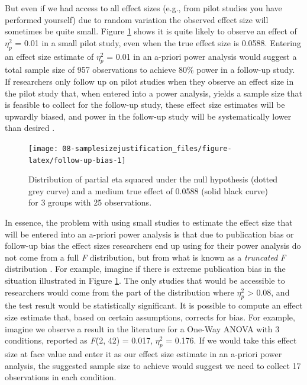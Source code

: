 \documentclass[
]{krantz}
\begin{document}
But even if we had access to all effect sizes (e.g., from pilot studies you have performed yourself) due to random variation the observed effect size will sometimes be quite small. Figure \ref{fig:follow-up-bias} shows it is quite likely to observe an effect of \(\eta_p^2\) = 0.01 in a small pilot study, even when the true effect size is 0.0588. Entering an effect size estimate of \(\eta_p^2\) = 0.01 in an a-priori power analysis would suggest a total sample size of 957 observations to achieve 80\% power in a follow-up study. If researchers only follow up on pilot studies when they observe an effect size in the pilot study that, when entered into a power analysis, yields a sample size that is feasible to collect for the follow-up study, these effect size estimates will be upwardly biased, and power in the follow-up study will be systematically lower than desired \citep{albers_when_2018}.

\begin{figure}

{\centering \texttt{[image: 08-samplesizejustification\_files/figure-latex/follow-up-bias-1]} 

}

\caption{Distribution of partial eta squared under the null hypothesis (dotted grey curve) and a medium true effect of 0.0588 (solid black curve) for 3 groups with 25 observations.}\label{fig:follow-up-bias}
\end{figure}

In essence, the problem with using small studies to estimate the effect size that will be entered into an a-priori power analysis is that due to publication bias or follow-up bias the effect sizes researchers end up using for their power analysis do not come from a full \emph{F} distribution, but from what is known as a \emph{truncated} \emph{F} distribution \citep{taylor_bias_1996}. For example, imagine if there is extreme publication bias in the situation illustrated in Figure \ref{fig:follow-up-bias}. The only studies that would be accessible to researchers would come from the part of the distribution where \(\eta_p^2\) \textgreater{} 0.08, and the test result would be statistically significant. It is possible to compute an effect size estimate that, based on certain assumptions, corrects for bias. For example, imagine we observe a result in the literature for a One-Way ANOVA with 3 conditions, reported as \emph{F}(2, 42) = 0.017, \(\eta_p^2\) = 0.176. If we would take this effect size at face value and enter it as our effect size estimate in an a-priori power analysis, the suggested sample size to achieve would suggest we need to collect 17 observations in each condition.
\end{document}

